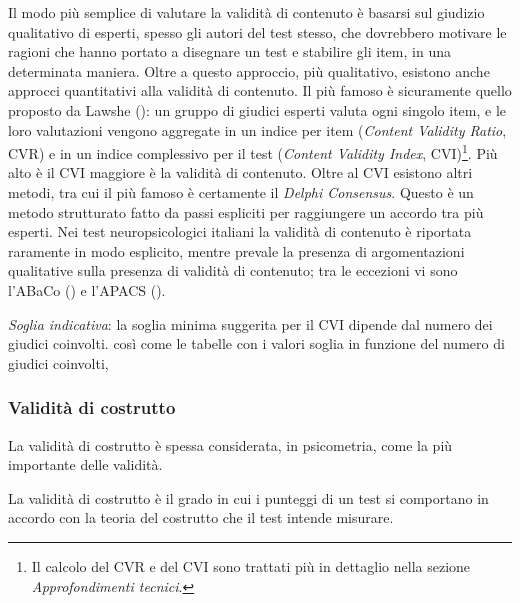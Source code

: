 \documentclass[
  italian,
  letterpaper,
  paper=6in:9in,
  pagesize=pdftex,
  headinclude=on,
  footinclude=on,
  11pt]{scrbook}
\begin{document}
Il modo più semplice di valutare la validità di contenuto è basarsi sul
giudizio qualitativo di esperti, spesso gli autori del test stesso, che
dovrebbero motivare le ragioni che hanno portato a disegnare un test e
stabilire gli item, in una determinata maniera. Oltre a questo
approccio, più qualitativo, esistono anche approcci quantitativi alla
validità di contenuto. Il più famoso è sicuramente quello proposto da
Lawshe (\citeyear{lawshe1975quantitative}): un gruppo di giudici esperti
valuta ogni singolo item, e le loro valutazioni vengono aggregate in un
indice per item (\emph{Content Validity Ratio}, CVR) e in un indice
complessivo per il test (\emph{Content Validity Index}, CVI)\footnote{Il
  calcolo del CVR e del CVI sono trattati più in dettaglio nella sezione
  \emph{Approfondimenti tecnici}.}. Più alto è il CVI maggiore è la
validità di contenuto. Oltre al CVI esistono altri metodi, tra cui il
più famoso è certamente il \emph{Delphi Consensus}. Questo è un metodo
strutturato fatto da passi espliciti per raggiungere un accordo tra più
esperti. Nei test neuropsicologici italiani la validità di contenuto è
riportata raramente in modo esplicito, mentre prevale la presenza di
argomentazioni qualitative sulla presenza di validità di contenuto; tra
le eccezioni vi sono l'ABaCo (\cite{sacco2008abaco}) e l'APACS
(\cite{arcara2016apacs}).

\emph{Soglia indicativa}: la soglia minima suggerita per il CVI dipende
dal numero dei giudici coinvolti. così come le tabelle con i valori
soglia in funzione del numero di giudici coinvolti,

\subsubsection{Validità di costrutto}\label{validituxe0-di-costrutto}

La validità di costrutto è spessa considerata, in psicometria, come la
più importante delle validità.

\begin{tcolorbox}[enhanced jigsaw, title=\textcolor{quarto-callout-note-color}{\faInfo}\hspace{0.5em}{Definizione}, coltitle=black, bottomtitle=1mm, colback=white, bottomrule=.15mm, rightrule=.15mm, breakable, toptitle=1mm, left=2mm, colbacktitle=quarto-callout-note-color!10!white, titlerule=0mm, colframe=quarto-callout-note-color-frame, leftrule=.75mm, opacitybacktitle=0.6, arc=.35mm, toprule=.15mm, opacityback=0]

La validità di costrutto è il grado in cui i punteggi di un test si
comportano in accordo con la teoria del costrutto che il test intende
misurare.

\end{tcolorbox}
\end{document}
